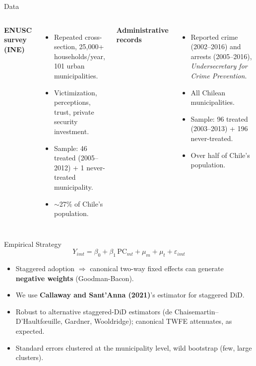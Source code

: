 \documentclass[11pt,aspectratio=169]{beamer}
\begin{document}
\begin{frame}{Data}
\begin{columns}[T]
\textbf{ENUSC survey (INE)}
\begin{itemize}
\item Repeated cross-section, 25,000+ households/year, 101 urban municipalities.
\item Victimization, perceptions, trust, private security investment.
\item Sample: 46 treated (2005--2012) + 1 never-treated municipality.
\item $\sim$27\% of Chile's population.
\end{itemize}
\textbf{Administrative records}
\begin{itemize}
\item Reported crime (2002--2016) and arrests (2005--2016), \emph{Undersecretary for Crime Prevention}.
\item All Chilean municipalities.
\item Sample: 96 treated (2003--2013) + 196 never-treated.
\item Over half of Chile's population.
\end{itemize}
\end{columns}
\end{frame}

\begin{frame}{Empirical Strategy}
\begin{equation*}
Y_{imt} = \beta_0 + \beta_1\, \text{PC}_{mt} + \mu_m + \mu_t + \varepsilon_{imt}
\end{equation*}
\begin{itemize}
\item Staggered adoption $\Rightarrow$ canonical two-way fixed effects can generate \textbf{negative weights} (Goodman-Bacon).
\item We use \textbf{Callaway and Sant'Anna (2021)}'s estimator for staggered DiD.
\item Robust to alternative staggered-DiD estimators (de Chaisemartin--D'Haultf\oe uille, Gardner, Wooldridge); canonical TWFE attenuates, as expected.
\item Standard errors clustered at the municipality level, wild bootstrap (few, large clusters).
\end{itemize}
\end{frame}
\end{document}
